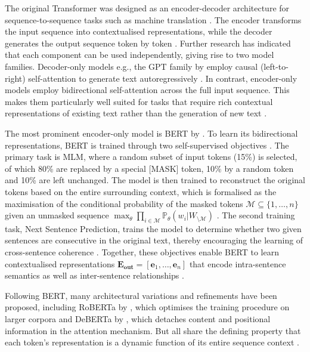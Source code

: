 The original Transformer was designed as an encoder-decoder architecture for sequence-to-sequence tasks such as machine translation \cite[p. 208 f.]{Goldberg2017}\cite{Vaswani2017}. The encoder transforms the input sequence into contextualised representations, while the decoder generates the output sequence token by token \cite[p. 198 f.]{Goldberg2017}\cite{Vaswani2017}. Further research has indicated that each component can be used independently, giving rise to two model families. Decoder-only models e.g., the GPT family by \citet{radford_improving_2018} employ causal (left-to-right) self-attention to generate text autoregressively \cite[p. 383 f.]{Bishop2024}. In contrast, encoder-only models employ bidirectional self-attention across the full input sequence. This makes them particularly well suited for tasks that require rich contextual representations of existing text rather than the generation of new text \cite[p. 388 f.]{Bishop2024}\cite{devlin_2019_bert}.

The most prominent encoder-only model is \ac{BERT} by \citet{devlin_2019_bert}. To learn its bidirectional representations, \ac{BERT} is trained through two self-supervised objectives \cite[p. 219 f.]{prince2023understanding}.  The primary task is \ac{MLM}, where a random subset of input tokens (15\%) is selected, of which 80\% are replaced by a special [MASK] token, 10\% by a random token and 10\% are left unchanged. The model is then trained to reconstruct the original tokens based on the entire surrounding context, which is formalised as the maximisation of the conditional probability of the masked tokens $\mathcal{M}  \subseteq \{1, \dots, n\}$ given an unmasked sequence $\max_\theta \prod_{i \in \mathcal{M}} \mathbb{P}_\theta(w_i | W_{\setminus \mathcal{M}})$ \cite[p. 388]{Bishop2024}\cite[p. 202 f.]{Jurafsky2024_SLP}\cite{devlin_2019_bert}. The second training task, Next Sentence Prediction, trains the model to determine whether two given sentences are consecutive in the original text, thereby encouraging the learning of cross-sentence coherence \cite[p. 204 f.]{Jurafsky2024_SLP}\cite{devlin_2019_bert}. Together, these objectives enable \ac{BERT} to learn contextualised representations $\mathbf{E_{\text{out}}} = [\mathbf{e}_1, \dots, \mathbf{e}_n]$ that encode intra-sentence semantics as well as inter-sentence relationships \cite{rogers_2020_bertology}.

Following \ac{BERT}, many architectural variations and refinements have been proposed, including RoBERTa by \citet{liu2019roberta}, which optimises the training procedure on larger corpora and DeBERTa by \citet{he2021debertadecodingenhancedbertdisentangled}, which detaches content and positional information in the attention mechanism. But all share the defining property that each token's representation is a dynamic function of its entire sequence context \cite[p. 207 f.]{Jurafsky2024_SLP}.

